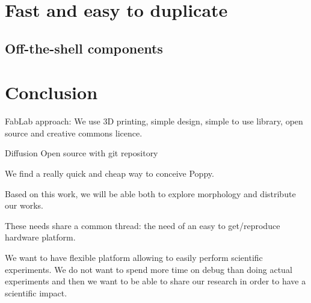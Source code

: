 \section{Fast and easy to duplicate} %

\subsection{Off-the-shell components} %




\section{Conclusion} %

FabLab approach: We use 3D printing, simple design, simple to use library, open source and creative commons licence.

Diffusion Open source with git repository

We find a really quick and cheap way to conceive Poppy.

Based on this work, we will be able both to explore morphology and distribute our works.

These needs share a common thread: the need of an easy to get/reproduce hardware platform.

We want to have flexible platform allowing to easily perform scientific experiments. We do not want to spend more time on debug than doing actual experiments and then we want to be able to share our research in order to have a scientific impact.



